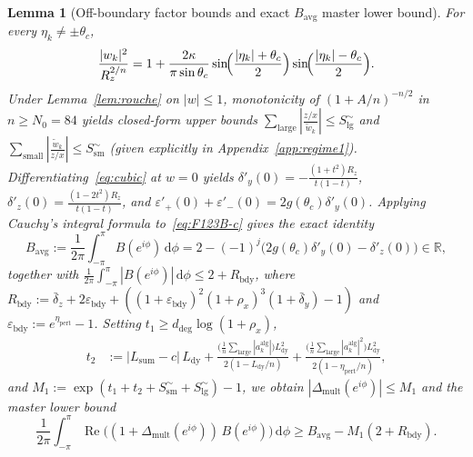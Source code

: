 \documentclass[10pt]{article}
\numberwithin{equation}{section}
\theoremstyle{plain}
\newtheorem{lemma}[theorem]{Lemma}
\theoremstyle{definition}
\newcommand{\dd}{\mathrm{d}}
\newcommand{\R}{\mathbb{R}}
\newcommand{\1}{\mathbf{1}}
\DeclareMathOperator{\re}{Re}
\begin{document}
\begin{lemma}[Off-boundary factor bounds and exact $B_{\mathrm{avg}}$ master lower bound]\label{lem:master-r1}
For every $\eta_k \ne \pm\theta_c$,
\begin{equation}\label{eq:off-bdy-id}
\frac{|w_k|^2}{R_z^{2/n}} = 1 + \frac{2\kappa}{\pi\sin\theta_c}\sin\!\Bigl(\frac{|\eta_k|+\theta_c}{2}\Bigr)\sin\!\Bigl(\frac{|\eta_k|-\theta_c}{2}\Bigr).
\end{equation}
Under Lemma~\ref{lem:rouche} on $|w| \le 1$, monotonicity of $(1 + A/n)^{-n/2}$ in $n \ge N_0 = 84$ yields closed-form upper bounds $\sum_{\mathrm{large}} |\frac{z/x}{\tilde{w}_k}| \le S_{\mathrm{lg}}^\sim$ and $\sum_{\mathrm{small}} |\frac{\tilde{w}_k}{z/x}| \le S_{\mathrm{sm}}^\sim$ (given explicitly in Appendix~\ref{app:regime1}). Differentiating~\eqref{eq:cubic} at $w = 0$ yields $\delta'_y(0) = -\frac{(1+t^2)R_z}{t(1-t)}$, $\delta'_z(0) = \frac{(1-2t^2)R_z}{t(1-t)}$, and $\varepsilon'_+(0) + \varepsilon'_-(0) = 2 g(\theta_c)\delta'_y(0)$. Applying Cauchy's integral formula to~\eqref{eq:F123B-c} gives the exact identity
\begin{equation}\label{eq:Bavg}
B_{\mathrm{avg}} := \frac{1}{2\pi}\int_{-\pi}^{\pi} B(e^{i\phi})\,\dd\phi = 2 - (-1)^j\bigl(2 g(\theta_c)\delta'_y(0) - \delta'_z(0)\bigr) \in \R,
\end{equation}
together with $\frac{1}{2\pi}\int_{-\pi}^{\pi} |B(e^{i\phi})|\,\dd\phi \le 2 + R_{\mathrm{bdy}}$, where $R_{\mathrm{bdy}} := \bar{\delta}_z + 2\varepsilon_{\mathrm{bdy}} + ((1+\varepsilon_{\mathrm{bdy}})^2(1+\rho_x)^3(1+\bar{\delta}_y) - 1)$ and $\varepsilon_{\mathrm{bdy}} := e^{\eta_{\mathrm{pert}}} - 1$. Setting $t_1 \ge d_{\mathrm{deg}}\log(1 + \rho_x)$,
\begin{align*}
t_2 &:= |L_{\mathrm{sum}} - c|\, L_{\mathrm{dy}}
+ \frac{\bigl(\frac{1}{n}\sum_{\mathrm{large}}|a_k^{\mathrm{alg}}|\bigr) L_{\mathrm{dy}}^2}{2(1 - L_{\mathrm{dy}}/n)}
+ \frac{\bigl(\frac{1}{n}\sum_{\mathrm{large}}|a_k^{\mathrm{alg}}|^2\bigr) L_{\mathrm{dy}}^2}{2(1 - \eta_{\mathrm{pert}}/n)},
\end{align*}
and $M_1 := \exp(t_1 + t_2 + S_{\mathrm{sm}}^\sim + S_{\mathrm{lg}}^\sim) - 1$, we obtain $|\Delta_{\mathrm{mult}}(e^{i\phi})| \le M_1$ and the master lower bound
\begin{equation}\label{eq:master-r1}
\frac{1}{2\pi}\int_{-\pi}^{\pi}\re\bigl((1 + \Delta_{\mathrm{mult}}(e^{i\phi}))\, B(e^{i\phi})\bigr)\,\dd\phi \ge B_{\mathrm{avg}} - M_1(2 + R_{\mathrm{bdy}}).
\end{equation}
\end{lemma}
\end{document}
